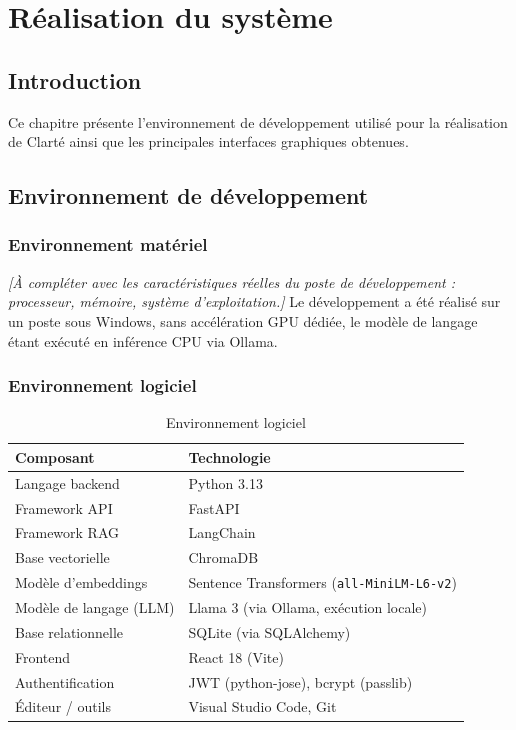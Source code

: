 \documentclass[12pt,a4paper]{report}
\newcommand{\note}[1]{\textit{[#1]}}
\begin{document}
\chapter{Réalisation du système}

\section{Introduction}
Ce chapitre présente l'environnement de développement utilisé pour la réalisation de Clarté ainsi que les principales interfaces graphiques obtenues.

\section{Environnement de développement}

\subsection{Environnement matériel}
\note{À compléter avec les caractéristiques réelles du poste de développement : processeur, mémoire, système d'exploitation.} Le développement a été réalisé sur un poste sous Windows, sans accélération GPU dédiée, le modèle de langage étant exécuté en inférence CPU via Ollama.

\subsection{Environnement logiciel}

\begin{table}[h]
\centering
\caption{Environnement logiciel}
\begin{tabular}{|l|l|}
\hline
\textbf{Composant} & \textbf{Technologie} \\
\hline
Langage backend & Python 3.13 \\
Framework API & FastAPI \\
Framework RAG & LangChain \\
Base vectorielle & ChromaDB \\
Modèle d'embeddings & Sentence Transformers (\texttt{all-MiniLM-L6-v2}) \\
Modèle de langage (LLM) & Llama 3 (via Ollama, exécution locale) \\
Base relationnelle & SQLite (via SQLAlchemy) \\
Frontend & React 18 (Vite) \\
Authentification & JWT (python-jose), bcrypt (passlib) \\
Éditeur / outils & Visual Studio Code, Git \\
\hline
\end{tabular}
\end{table}
\end{document}
